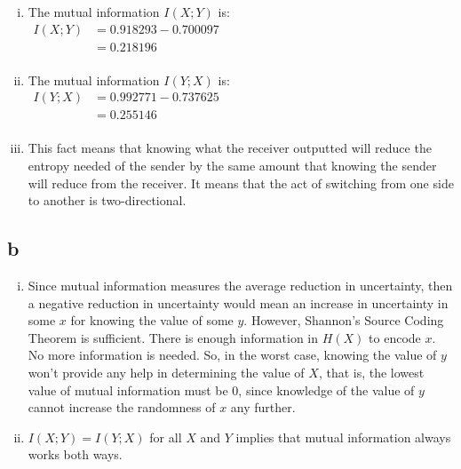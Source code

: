 \documentclass[letterpaper,notitlepage,twoside]{article}
\begin{document}
\begin{enumerate}[(i)]
\item The mutual information $I(X ; Y)$ is: \\
$\begin{aligned}
I(X;Y) &= 0.918293 - 0.700097 \\ 
&= 0.218196 \\
\end{aligned}$

\item The mutual information $I(Y ; X)$ is: \\
$\begin{aligned}
I(Y;X) &= 0.992771 - 0.737625 \\
&= 0.255146 \\
\end{aligned}$

\item This fact means that knowing what the receiver outputted will reduce the entropy needed of the sender by the same amount that knowing the sender will reduce from the receiver. It means that the act of switching from one side to another is two-directional.

\end{enumerate}

\subsection*{b}
\begin{enumerate}[(i)]
\item Since mutual information measures the average reduction in uncertainty, then a negative reduction in uncertainty would mean an increase in uncertainty in some $x$ for knowing the value of some $y$. However, Shannon's Source Coding Theorem is sufficient. There is enough information in $H(X)$ to encode $x$. No more information is needed. So, in the worst case, knowing the value of $y$ won't provide any help in determining the value of $X$, that is, the lowest value of mutual information must be 0, since knowledge of the value of $y$ cannot increase the randomness of $x$ any further.
\item $I(X ; Y) = I(Y ; X)$ for all $X$ and $Y$ implies that mutual information always works both ways.
\end{enumerate}
\end{document}
